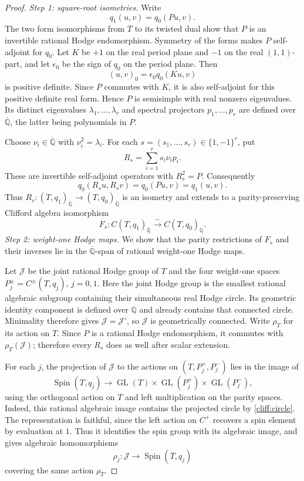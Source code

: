 \begin{proof}
\emph{Step 1: square-root isometries.}
Write
\begin{equation}\label{data:P}
 q_1(u,v)=q_0(Pu,v).
\end{equation}
The two form isomorphisms from $T$ to its twisted dual show that
$P$ is an invertible rational Hodge endomorphism. Symmetry of the
forms makes $P$ self-adjoint for $q_0$.
Let $K$ be $+1$ on the real period plane and $-1$ on the real
$(1,1)$-part, and let $\epsilon_0$ be the sign of $q_0$ on the
period plane. Then
\[
 (u,v)_0=\epsilon_0 q_0(Ku,v)
\]
is positive definite. Since $P$ commutes with $K$, it is also
self-adjoint for this positive definite real form. Hence $P$ is
semisimple with real nonzero eigenvalues. Its distinct eigenvalues
$\lambda_1,\ldots,\lambda_r$ and spectral projectors
$p_1,\ldots,p_r$ are defined over $\overline{\mathbb Q}$, the latter
being polynomials in $P$.

Choose $\nu_i\in\overline{\mathbb Q}$ with $\nu_i^2=\lambda_i$.
For each $s=(s_1,\ldots,s_r)\in\{1,-1\}^r$, put
\begin{equation}\label{data:roots}
 R_s=\sum_{i=1}^r s_i\nu_i p_i.
\end{equation}
These are invertible self-adjoint operators with $R_s^2=P$.
Consequently
\[
 q_0(R_su,R_sv)=q_0(Pu,v)=q_1(u,v).
\]
Thus $R_s:(T,q_1)_{\overline{\mathbb Q}}\to
(T,q_0)_{\overline{\mathbb Q}}$ is an isometry and extends to a
parity-preserving Clifford algebra isomorphism
\[
 F_s:C(T,q_1)_{\overline{\mathbb Q}}
          \xrightarrow{\sim}C(T,q_0)_{\overline{\mathbb Q}}.
\]
\smallskip\noindent
\emph{Step 2: weight-one Hodge maps.}
We show that the parity restrictions of $F_s$ and their inverses lie
in the $\overline{\mathbb Q}$-span of rational weight-one Hodge maps.

Let $\mathcal J$ be the joint rational Hodge group of $T$ and the
four weight-one spaces $P_j^\pm=C^\pm(T,q_j)$, $j=0,1$.
Here the joint Hodge group is the smallest rational algebraic
subgroup containing their simultaneous real Hodge circle.
Its geometric identity component is defined over $\mathbb Q$ and
already contains that connected circle. Minimality therefore gives
$\mathcal J=\mathcal J^\circ$, so $\mathcal J$ is geometrically
connected. Write $\rho_T$ for its action on
$T$. Since $P$ is a rational Hodge endomorphism, it commutes with
$\rho_T(\mathcal J)$; therefore every $R_s$ does as well after
scalar extension.

For each $j$, the projection of $\mathcal J$ to the actions on
$(T,P_j^+,P_j^-)$ lies in the image of
\[
 \operatorname{Spin}(T,q_j)\longrightarrow
 \operatorname{GL}(T)\times\operatorname{GL}(P_j^+)
                      \times\operatorname{GL}(P_j^-),
\]
using the orthogonal action on $T$ and left multiplication on
the parity spaces. Indeed, this rational algebraic image contains
the projected circle by \eqref{cliff:circle}. The representation
is faithful, since the left action on $C^+$ recovers a spin
element by evaluation at $1$. Thus it identifies the spin group
with its algebraic image, and gives algebraic homomorphisms
\[
 \rho_j:\mathcal J\longrightarrow\operatorname{Spin}(T,q_j)
\]
covering the same action $\rho_T$.


\end{proof}
